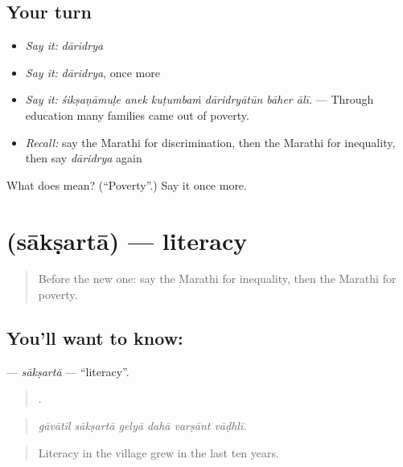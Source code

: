 \subsection*{Your turn}
\begin{itemize}
\raggedright
  \item \emph{Say it:} \emph{dāridrya}
  \item \emph{Say it:} \emph{dāridrya}, once more
  \item \emph{Say it:} \emph{śikṣaṇāmuḷe anek kuṭumbaṁ dāridryātūn bāher ālī.} — Through education many families came out of poverty.
  \item \emph{Recall:} say the Marathi for discrimination, then the Marathi for inequality, then say \emph{dāridrya} again
\end{itemize}

\begin{tcolorbox}[breakable,colback=teal!4,colframe=teal!35!black,title={Before you move on}]
What does  mean? (\textquotedblleft{}Poverty\textquotedblright{}.) Say it once more.
\end{tcolorbox}
\section[\texorpdfstring{\mr{साक्षरता} (sākṣartā)}{साक्षरता (sākṣartā)}]{ (sākṣartā) — literacy}

\label{lesson:MR-C360-saksarta}



\begin{quote}
Before the new one: say the Marathi for inequality, then the Marathi for poverty.
\end{quote}

\subsection*{You'll want to know: }
\textbf{} — \emph{sākṣartā} — \textquotedblleft{}literacy\textquotedblright{}.

\begin{quote}
     .
\end{quote}

\begin{quote}
\emph{gāvātīl sākṣartā gelyā dahā varṣānt vāḍhlī.}
\end{quote}

\begin{quote}
Literacy in the village grew in the last ten years.
\end{quote}

